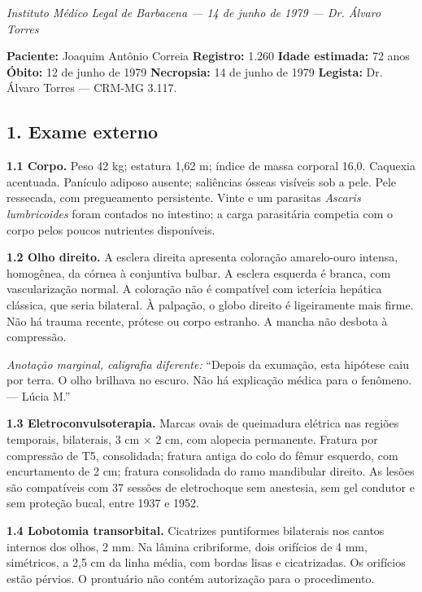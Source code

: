 
\noindent \textit{Instituto Médico Legal de Barbacena --- 14 de junho de 1979 --- Dr. Álvaro Torres}

\noindent \textbf{Paciente:} Joaquim Antônio Correia \quad \textbf{Registro:} 1.260 \quad \textbf{Idade estimada:} 72 anos \quad \textbf{Óbito:} 12 de junho de 1979 \quad \textbf{Necropsia:} 14 de junho de 1979 \quad \textbf{Legista:} Dr. Álvaro Torres --- CRM-MG 3.117.

\subsection*{1. Exame externo}

\noindent \textbf{1.1 Corpo.} Peso 42 kg; estatura 1,62 m; índice de massa corporal 16,0. Caquexia acentuada. Panículo adiposo ausente; saliências ósseas visíveis sob a pele. Pele ressecada, com pregueamento persistente. Vinte e um parasitas \textit{Ascaris lumbricoides} foram contados no intestino; a carga parasitária competia com o corpo pelos poucos nutrientes disponíveis.

\noindent \textbf{1.2 Olho direito.} A esclera direita apresenta coloração amarelo-ouro intensa, homogênea, da córnea à conjuntiva bulbar. A esclera esquerda é branca, com vascularização normal. A coloração não é compatível com icterícia hepática clássica, que seria bilateral. À palpação, o globo direito é ligeiramente mais firme. Não há trauma recente, prótese ou corpo estranho. A mancha não desbota à compressão.

\noindent \textit{Anotação marginal, caligrafia diferente:} ``Depois da exumação, esta hipótese caiu por terra. O olho brilhava no escuro. Não há explicação médica para o fenômeno. --- Lúcia M.''

\noindent \textbf{1.3 Eletroconvulsoterapia.} Marcas ovais de queimadura elétrica nas regiões temporais, bilaterais, 3 cm × 2 cm, com alopecia permanente. Fratura por compressão de T5, consolidada; fratura antiga do colo do fêmur esquerdo, com encurtamento de 2 cm; fratura consolidada do ramo mandibular direito. As lesões são compatíveis com 37 sessões de eletrochoque sem anestesia, sem gel condutor e sem proteção bucal, entre 1937 e 1952.

\noindent \textbf{1.4 Lobotomia transorbital.} Cicatrizes puntiformes bilaterais nos cantos internos dos olhos, 2 mm. Na lâmina cribriforme, dois orifícios de 4 mm, simétricos, a 2,5 cm da linha média, com bordas lisas e cicatrizadas. Os orifícios estão pérvios. O prontuário não contém autorização para o procedimento.

